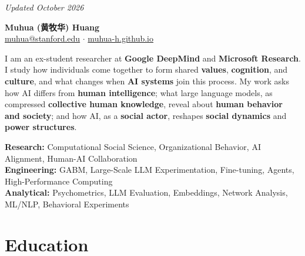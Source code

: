 \documentclass[11pt,letterpaper]{article}
\begin{document}
\begin{flushright}
\vspace{-1em}
\footnotesize\textit{Updated October 2026}
\end{flushright}

\vspace{-1em}

\begin{center}
{\LARGE\bfseries Muhua (黄牧华) Huang}\\[0.4em]
{\small\color{gray}
\href{mailto:muhua@stanford.edu}{muhua@stanford.edu}
\quad$\cdot$\quad
\href{https://muhua-h.github.io/}{muhua-h.github.io}}
\end{center}

\vspace{-0.3em}

\begin{statementbox}
\noindent I am an ex-student researcher at \textbf{Google DeepMind} and \textbf{Microsoft Research}.
I study how individuals come together to form shared \textbf{values}, \textbf{cognition},
and \textbf{culture}, and what changes when \textbf{AI systems} join this process. My work asks how AI differs
from \textbf{human intelligence}; what large language models, as compressed \textbf{collective human knowledge},
reveal about \textbf{human behavior and society}; and how AI, as a \textbf{social actor}, reshapes
\textbf{social dynamics} and \textbf{power structures}.
\end{statementbox}

\vspace{0.5em}

\noindent\textcolor{accent}{\textbf{Research:}} Computational Social Science, Organizational Behavior, AI Alignment,
Human-AI Collaboration\\
\noindent\textcolor{accent}{\textbf{Engineering:}} GABM, Large-Scale LLM
Experimentation, Fine-tuning, Agents, High-Performance Computing\\
\noindent\textcolor{accent}{\textbf{Analytical:}} Psychometrics, LLM Evaluation, Embeddings, Network
Analysis, ML/NLP, Behavioral Experiments

\section*{Education}
\end{document}
